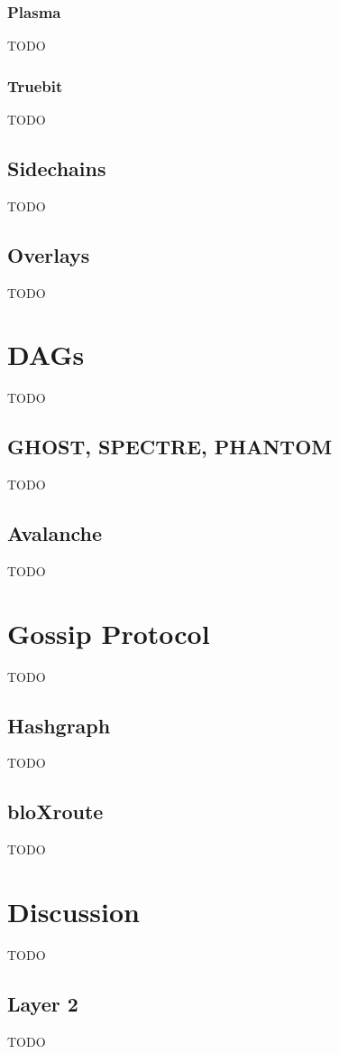 \documentclass{article}
\begin{document}
\subsubsection{Plasma}
TODO

\subsubsection{Truebit}
TODO

\subsection{Sidechains}
TODO

\subsection{Overlays}
TODO


\section{DAGs}
TODO

\subsection{GHOST, SPECTRE, PHANTOM}
TODO

\subsection{Avalanche}
TODO


\section{Gossip Protocol}
TODO

\subsection{Hashgraph}
TODO

\subsection{bloXroute}
TODO


\section{Discussion}
TODO

\subsection{Layer 2}
TODO
\end{document}
